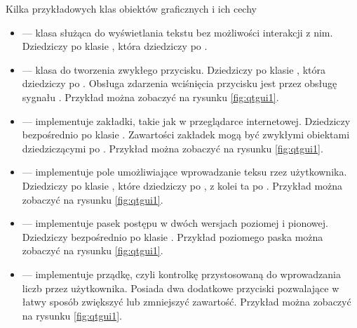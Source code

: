\par
Kilka przykładowych klas obiektów graficznych i ich cechy
\begin{itemize}
    \item {} --- klasa służąca do wyświetlania tekstu bez możliwości interakcji z nim.
          Dziedziczy po klasie , która dziedziczy po .

    \item {} --- klasa do tworzenia zwykłego przycisku.
          Dziedziczy po klasie , która dziedziczy po .
          Obsługa zdarzenia wciśnięcia przycisku jest przez obsługę sygnału .
          Przykład można zobaczyć na rysunku \ref{fig:qtgui1}.

    \item {} --- implementuje zakładki, takie jak w przeglądarce internetowej.
          Dziedziczy bezpośrednio po klasie .
          Zawartości zakładek mogą być zwykłymi obiektami dziedziczącymi po .
          Przykład można zobaczyć na rysunku \ref{fig:qtgui1}.

    \item {} --- implementuje pole umożliwiające wprowadzanie teksu rzez użytkownika.
          Dziedziczy po klasie , które dziedziczy po  , z kolei ta po .
          Przykład można zobaczyć na rysunku \ref{fig:qtgui1}.

    \item {} --- implementuje pasek postępu w dwóch wersjach poziomej i pionowej.
          Dziedziczy bezpośrednio po klasie .
          Przykład poziomego paska można zobaczyć na rysunku \ref{fig:qtgui1}.

    \item {} --- implementuje prządkę, czyli kontrolkę przystosowaną do wprowadzania liczb przez użytkownika.
          Posiada dwa dodatkowe przyciski pozwalające w łatwy sposób zwiększyć lub zmniejszyć zawartość.
          Przykład można zobaczyć na rysunku \ref{fig:qtgui1}.

\end{itemize}